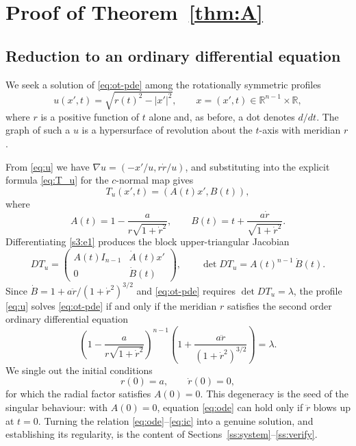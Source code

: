 \documentclass[12pt,letterpaper]{amsart}
\theoremstyle{definition}
\theoremstyle{plain}
\numberwithin{equation}{section}
\newcommand{\R}{\mathbb{R}}
\newcommand{\D}{\nabla}
\begin{document}
\section{Proof of Theorem~\ref{thm:A}}\label{sec:thmA}

\subsection{Reduction to an ordinary differential equation}\label{ss:reduction}

We seek a solution of \eqref{eq:ot-pde} among the rotationally symmetric profiles
\begin{equation}\label{eq:u}
    u(x',t)=\sqrt{r(t)^2-|x'|^2},\qquad x=(x',t)\in\R^{n-1}\times\R,
\end{equation}
where $r$ is a positive function of $t$ alone and, as before, a dot denotes $d/dt$.
The graph of such a $u$ is a hypersurface of revolution about the $t$-axis with meridian $r$.

From \eqref{eq:u} we have $\D u=(-x'/u,r\dot r/u)$, and substituting into the
explicit formula \eqref{eq:T_u} for the $c$-normal map gives
\begin{equation}\label{s3:e1}
    T_u(x',t)=(A(t)x',B(t)),
\end{equation}
where
\begin{equation}\label{eq:A-B}
    A(t)=1-\frac{a}{r\sqrt{1+\dot{r}^2}},\qquad
    B(t)=t+\frac{a\dot{r}}{\sqrt{1+\dot{r}^2}}.
\end{equation}
Differentiating \eqref{s3:e1} produces the block upper-triangular Jacobian
\begin{equation}\label{eq:DT_u}
    DT_u=
    \begin{pmatrix}
        A(t)I_{n-1} & \dot{A}(t)x'\\
        0 & \dot{B}(t)
    \end{pmatrix},
    \qquad
    \det DT_u=A(t)^{n-1}\,\dot{B}(t).
\end{equation}
Since $\dot B=1+a\ddot r/(1+\dot r^2)^{3/2}$ and \eqref{eq:ot-pde} requires $\det DT_u=\lambda$,
the profile \eqref{eq:u} solves \eqref{eq:ot-pde} if and only if the meridian $r$ satisfies the
second order ordinary differential equation
\begin{equation}\label{eq:ode}
    \left(1-\frac{a}{r\sqrt{1+\dot{r}^2}}\right)^{n-1}
    \left(1+\frac{a\ddot{r}}{(1+\dot{r}^2)^{3/2}}\right)=\lambda.
\end{equation}
We single out the initial conditions
\begin{equation}\label{eq:ic}
    r(0)=a,\qquad \dot r(0)=0,
\end{equation}
for which the radial factor satisfies $A(0)=0$. This degeneracy is the seed of the singular
behaviour: with $A(0)=0$, equation \eqref{eq:ode} can hold only if $\ddot r$ blows up at $t=0$.
Turning the relation \eqref{eq:ode}--\eqref{eq:ic} into a genuine solution, and establishing its
regularity, is the content of Sections~\ref{ss:system}--\ref{ss:verify}.
\end{document}
